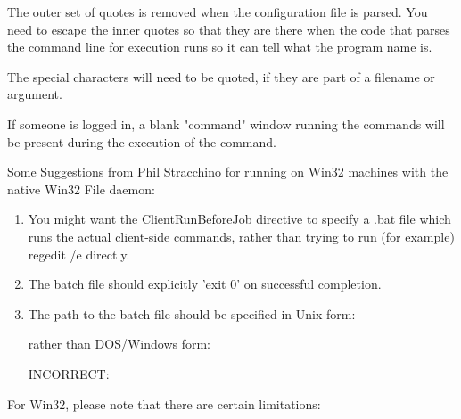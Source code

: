 {%

The outer set of quotes is removed when the configuration file is parsed.
You need to escape the inner quotes so that they are there when the code
that parses the command line for execution runs so it can tell what the
program name is.


The special characters \configCharsToQuote
will need to be quoted,
if they are part of a filename or argument.

If someone is logged in, a blank "command" window running the commands
will be present during the execution of the command.

Some Suggestions from Phil Stracchino for running on Win32 machines with
the native Win32 File daemon:

\begin{enumerate}
\item You might want the ClientRunBeforeJob directive to specify a .bat
      file which runs the actual client-side commands, rather than trying
      to run (for example) regedit /e directly.
\item The batch file should explicitly 'exit 0' on successful completion.
\item The path to the batch file should be specified in Unix form:


    rather than DOS/Windows form:

    INCORRECT: 
\end{enumerate}

For Win32, please note that there are certain limitations:

}

